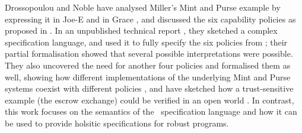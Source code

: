 Dro\-sso\-pou\-lou and Noble \cite{capeFTfJP,capeFTfJP14} have
analysed Miller's Mint and Purse example \cite{MillerPhD} by
expressing it in Joe-E 
and in Grace \cite{capeFTfJP14}, and discussed the six
capability policies 
as proposed in \cite{MillerPhD}.
In  an unpublished technical report
\cite{WAS-OOPSLA14-TR}, {they} %
sketched a complex specification language, and used it to fully
specify the six policies from \cite{MillerPhD}; %
{their} partial formalisation showed that %
several possible interpretations were possible.  They also uncovered
the need for another four policies and formalised them as well,
showing how different implementations of the underlying Mint and Purse
systems coexist with different policies \cite{capeIFM14},
and have sketched how 
a trust-sensitive 
example (the escrow exchange) could be verified in an open world
\cite{swapsies}. 
In contrast, this work focuses on the semantics of the  \Chainmail\ specification
language and how it can be used to provide holsitic specifications for
robust programs.






